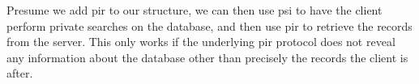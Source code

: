 Presume we add \acrshort{pir} to our structure, we can then use \acrshort{psi} to have the client perform private searches on the database, and then use \acrshort{pir} to retrieve the records from the server. This only works if the underlying \acrshort{pir} protocol does not reveal any information about the database other than precisely the records the client is after.